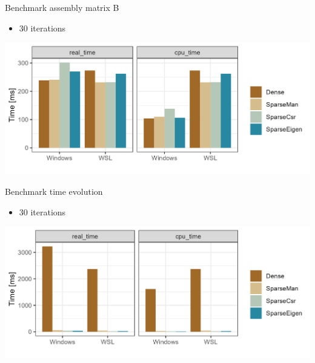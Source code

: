 \documentclass[aspectratio=169,xcolor=dvipsnames]{beamer}
\begin{document}
\begin{frame}{Benchmark assembly matrix B}
   
    \begin{itemize}
        \item 30 iterations
    \end{itemize}
    
    \begin{center}
   \includegraphics[width=0.8\linewidth]{assembly_bench_result.png}
   \end{center}
   
\end{frame}


\begin{frame}{Benchmark time evolution}
   
    \begin{itemize}
        \item 30 iterations
    \end{itemize}
    
    \begin{center}
   \includegraphics[width=0.8\linewidth]{timeevolution_bench_result.png}
   \end{center}
   
\end{frame}

\end{document}
